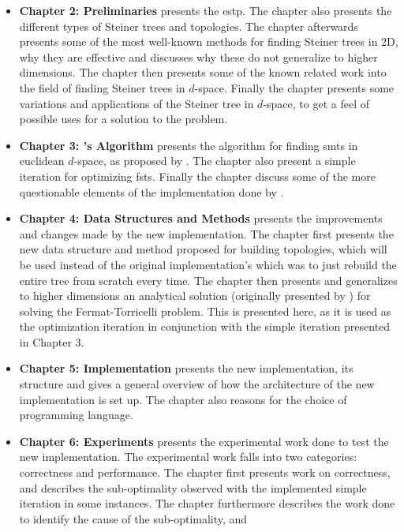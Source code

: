 \begin{itemize}
\item \textbf{Chapter 2: Preliminaries} \quad presents the \acl{estp}. The
  chapter also presents the different types of Steiner trees and topologies. The
  chapter afterwards presents some of the most well-known methods for finding
  Steiner trees in 2D, why they are effective and discusses why these do not
  generalize to higher dimensions. The chapter then presents some of the known
  related work into the field of finding Steiner trees in $d$-space. Finally the
  chapter presents some variations and applications of the Steiner tree in
  $d$-space, to get a feel of possible uses for a solution to the problem.
\item \textbf{Chapter 3: \citeauthor{smith1992}'s Algorithm} \quad presents the
  algorithm for finding \aclp{smt} in euclidean $d$-space, as proposed by
  \textcite{smith1992}. The chapter also present a simple iteration for
  optimizing \aclp{fst}. Finally the chapter discuss some of the more
  questionable elements of the implementation done by \citeauthor{smith1992}.
\item \textbf{Chapter 4: Data Structures and Methods} \quad presents the improvements and changes made by the new implementation. The
  chapter first presents the new data structure and method proposed for building
  topologies, which will be used instead of the original implementation's which
  was to just rebuild the entire tree from scratch every time. The chapter then
  presents and generalizes to higher dimensions an analytical solution
  (originally presented by \textcite{uteshev2014}) for solving the
  Fermat-Torricelli problem. This is presented here, as it is used as the
  optimization iteration in conjunction with the simple iteration presented in
  Chapter 3.
\item \textbf{Chapter 5: Implementation} \quad presents the new
  implementation, its structure and gives a general overview of how the
  architecture of the new implementation is set up. The chapter also reasons for
  the choice of programming language.
\item \textbf{Chapter 6: Experiments} \quad presents the
  experimental work done to test the new implementation. The experimental work
  falls into two categories: correctness and performance. The chapter first
  presents work on correctness, and describes the sub-optimality observed with
  the implemented simple iteration in some instances. The chapter furthermore
  describes the work done to identify the cause of the sub-optimality, and

\end{itemize}
